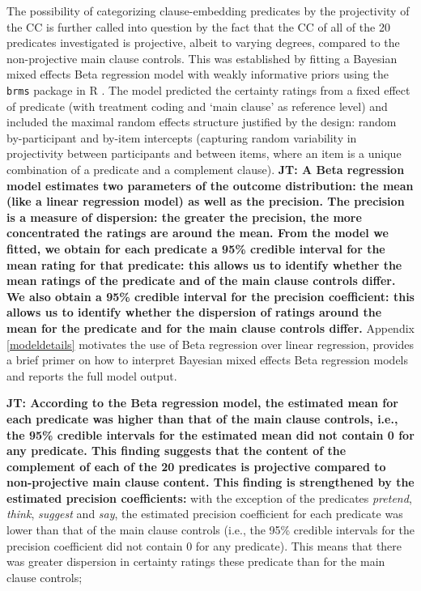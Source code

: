 \documentclass[11pt,fleqn]{article}
\newcommand{\6}{\mbox{$[\hspace*{-.6mm}[$}}
\newcommand{\9}{\mbox{$]\hspace*{-.6mm}]$}}
\newcommand{\jt}[1]{\textbf{\color{blue}JT: #1}}
\begin{document}
The possibility of categorizing clause-embedding predicates by the projectivity of the CC is further called into question by the fact that the CC of all of the 20 predicates investigated is projective, albeit to varying degrees, compared to the non-projective main clause controls. This was established by fitting a Bayesian mixed effects Beta regression model  with weakly informative priors using the \verb|brms| \citep{buerkner2017}  package in R \citep{R}.
The model predicted the certainty ratings from a fixed effect of predicate (with treatment coding and `main clause' as  reference level) and included the maximal random effects structure justified by the design: random by-participant and by-item intercepts (capturing random variability in projectivity between participants and between items, where an item is a unique combination of a predicate and a complement clause). \jt{A Beta regression model estimates two parameters of the outcome distribution: the mean  (like a linear regression model) as well as the precision. The precision is a measure of dispersion: the greater the precision, the more concentrated the ratings are around the mean. From the model we fitted, we obtain for each predicate a 95\% credible interval for the mean rating for that predicate: this allows us to identify whether the mean ratings of the predicate and of the main clause controls differ. We also obtain a 95\% credible interval for the precision coefficient: this allows us to identify whether the dispersion of ratings around the mean for the predicate and for the main clause controls differ.} Appendix \ref{modeldetails} motivates the use of Beta regression over linear regression, provides a brief primer on how to interpret Bayesian mixed effects Beta regression models and reports the full model output.

\jt{According to the Beta regression model, the estimated mean for each predicate was higher than that of the main clause controls, i.e., the 95\% credible intervals for the estimated mean did not contain 0 for any predicate. This finding suggests that the content of the complement of each of the 20 predicates is projective compared to non-projective main clause content. This finding is strengthened by the estimated precision coefficients:} with the exception of the predicates \emph{pretend},  \emph{think}, \emph{suggest} and \emph{say}, the estimated precision coefficient for each predicate was lower than that of the main clause controls (i.e., the 95\% credible intervals for the precision coefficient did not contain 0 for any predicate). This means that there was greater dispersion in certainty ratings these predicate than for the main clause controls; 
\end{document}
